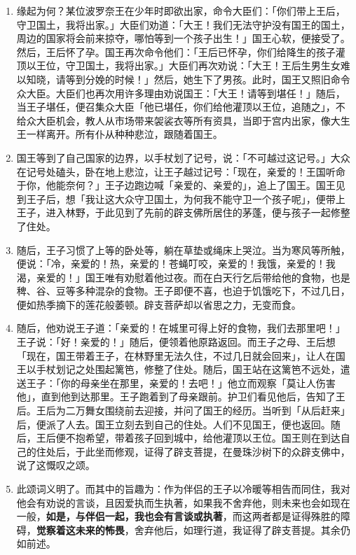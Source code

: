 \begin{enumerate}\item 缘起为何？某位波罗奈王在少年时即欲出家，命令大臣们：「你们带上王后，守卫国土，我将出家。」大臣们劝道：「大王！我们无法守护没有国王的国土，周边的国家将会前来掠夺，哪怕等到一个孩子出生！」国王心软，便接受了。然后，王后怀了孕。国王再次命令他们：「王后已怀孕，你们给降生的孩子灌顶以王位，守卫国土，我将出家。」大臣们再次劝说：「大王！王后生男生女难以知晓，请等到分娩的时候！」然后，她生下了男孩。此时，国王又照旧命令众大臣。大臣们也再次用许多理由劝说国王：「大王！请等到堪任！」随后，当王子堪任，便召集众大臣「他已堪任，你们给他灌顶以王位，追随之」，不给众大臣机会，教人从市场带来袈裟衣等所有资具，当即于宫内出家，像大生王一样离开。所有仆从种种悲泣，跟随着国王。
\item 国王等到了自己国家的边界，以手杖划了记号，说：「不可越过这记号。」大众在记号处磕头，卧在地上悲泣，让王子越过记号：「现在，亲爱的！王国听命于你，他能奈何？」王子边跑边喊「亲爱的、亲爱的」，追上了国王。国王见到王子后，想「我让这大众守卫国土，为何我不能守卫一个孩子呢」，便带上王子，进入林野，于此见到了先前的辟支佛所居住的茅蓬，便与孩子一起修整了住处。
\item 随后，王子习惯了上等的卧处等，躺在草垫或绳床上哭泣。当为寒风等所触，便说：「冷，亲爱的！热，亲爱的！苍蝇叮咬，亲爱的！我饿，亲爱的！我渴，亲爱的！」国王唯有劝慰着他过夜。而在白天行乞后带给他的食物，也是稗、谷、豆等多种混杂的食物。王子即便不喜，也迫于饥饿吃下，不过几日，便如热季摘下的莲花般萎顿。辟支菩萨却以省思之力，无变而食。
\item 随后，他劝说王子道：「亲爱的！在城里可得上好的食物，我们去那里吧！」王子说：「好！亲爱的！」随后，便领着他原路返回。而王子之母、王后想「现在，国王带着王子，在林野里无法久住，不过几日就会回来」，让人在国王以手杖划记之处围起篱笆，修整了住处。随后，国王站在这篱笆不远处，遣送王子：「你的母亲坐在那里，亲爱的！去吧！」他立而观察「莫让人伤害他」，直到他到达那里。王子跑着到了母亲跟前。护卫们看见他后，告知了王后。王后为二万舞女围绕前去迎接，并问了国王的经历。当听到「从后赶来」后，便派了人去。国王立刻去到自己的住处。人们不见国王，便也返回。随后，王后便不抱希望，带着孩子回到城中，给他灌顶以王位。国王则在到达自己的住处后，于此坐而修观，证得了辟支菩提，在曼珠沙树下的众辟支佛中，说了这慨叹之颂。
\item 此颂词义明了。而其中的旨趣为：作为伴侣的王子以冷暖等相告而同住，我对他会有劝说的言谈，且因爱执而生执著，如果我不舍弃他，则未来也会如现在一般，\textbf{如是，与伴侣一起，我也会有言谈或执著}，而这两者都是证得殊胜的障碍，\textbf{觉察着这未来的怖畏}，舍弃他后，如理行道，我证得了辟支菩提。其余仍如前述。\end{enumerate}

